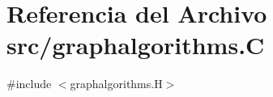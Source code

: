 \hypertarget{graphalgorithms_8_c}{}\section{Referencia del Archivo src/graphalgorithms.C}
\label{graphalgorithms_8_c}
{\ttfamily \#include $<$graphalgorithms.\+H$>$}\newline
